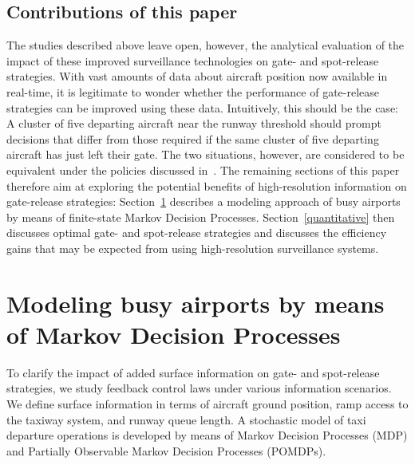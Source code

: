 \documentclass[letterpaper]{article}
\begin{document}
\subsection{Contributions of this paper}
The studies described above leave open, however, the analytical evaluation of the impact of these improved surveillance technologies on gate- and spot-release strategies. With vast amounts of data about aircraft position now available in real-time, it is legitimate to wonder whether the performance of gate-release strategies can be improved using these data. Intuitively, this should be the case: A cluster of five departing aircraft near the runway threshold should prompt decisions that differ from those required if the same cluster of five departing aircraft has just left their gate. The two situations, however, are considered to be equivalent under the policies discussed in~\cite{log99,SKB:11}.
The remaining sections of this paper therefore aim at exploring the potential benefits of high-resolution information on gate-release strategies: Section~\ref{principles} describes a modeling approach of busy airports by means of finite-state Markov Decision Processes. Section~\ref{quantitative} then discusses optimal gate- and spot-release strategies and discusses the efficiency gains that may be expected from using high-resolution surveillance systems.

\section{Modeling busy airports by means of Markov Decision Processes}
\label{principles}

To clarify the impact of added surface information on gate- and spot-release strategies, we study feedback control laws under various information scenarios. We define surface information in terms of aircraft ground position, ramp access to the taxiway system, and runway queue length. 
A stochastic model of taxi departure operations is developed by means of
Markov Decision Processes (MDP) and Partially Observable Markov Decision Processes (POMDPs). 
\end{document}
